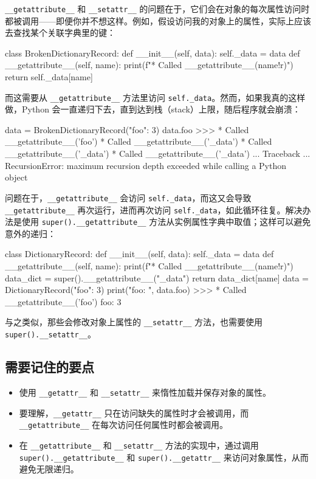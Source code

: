 \texttt{\_\_getattribute\_\_} 和 \texttt{\_\_setattr\_\_} 的问题在于，它们会在对象的每次属性访问时都被调用——即便你并不想这样。例如，假设访问我的对象上的属性，实际上应该去查找某个关联字典里的键：

\begin{codebox}[python]
class BrokenDictionaryRecord:
    def __init__(self, data):
        self._data = data
    def __getattribute__(self, name):
        print(f"* Called __getattribute__({name!r})")
        return self._data[name]
\end{codebox}

而这需要从 \texttt{\_\_getattribute\_\_} 方法里访问 \texttt{self.\_data}。然而，如果我真的这样做，Python 会一直递归下去，直到达到栈（stack）上限，随后程序就会崩溃：

\begin{codebox}[python]
data = BrokenDictionaryRecord({"foo": 3})
data.foo
>>>
* Called __getattribute__('foo')
* Called __getattribute__('_data')
* Called __getattribute__('_data')
* Called __getattribute__('_data')
...
Traceback ...
RecursionError: maximum recursion depth exceeded while calling
a Python object
\end{codebox}

问题在于，\texttt{\_\_getattribute\_\_} 会访问 \texttt{self.\_data}，而这又会导致 \texttt{\_\_getattribute\_\_} 再次运行，进而再次访问 \texttt{self.\_data}，如此循环往复。解决办法是使用 \texttt{super().\_\_getattribute\_\_} 方法从实例属性字典中取值；这样可以避免意外的递归：

\begin{codebox}[python]
class DictionaryRecord:
    def __init__(self, data):
        self._data = data
    def __getattribute__(self, name):
        print(f"* Called __getattribute__({name!r})")
        data_dict = super().__getattribute__("_data")
        return data_dict[name]
data = DictionaryRecord({"foo": 3})
print("foo: ", data.foo)
>>>
* Called __getattribute__('foo')
foo:  3
\end{codebox}

与之类似，那些会修改对象上属性的 \texttt{\_\_setattr\_\_} 方法，也需要使用 \texttt{super().\_\_setattr\_\_}。

\subsection{需要记住的要点}

\begin{itemize}
\item 使用 \texttt{\_\_getattr\_\_} 和 \texttt{\_\_setattr\_\_} 来惰性加载并保存对象的属性。
\item 要理解，\texttt{\_\_getattr\_\_} 只在访问缺失的属性时才会被调用，而 \texttt{\_\_getattribute\_\_} 在每次访问任何属性时都会被调用。
\item 在 \texttt{\_\_getattribute\_\_} 和 \texttt{\_\_setattr\_\_} 方法的实现中，通过调用 \texttt{super().\_\_getattribute\_\_} 和 \texttt{super().\_\_getattr\_\_} 来访问对象属性，从而避免无限递归。
\end{itemize}

